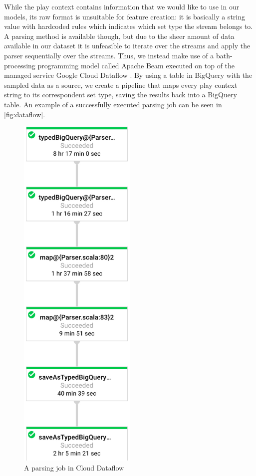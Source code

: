 \documentclass{kththesis}
\begin{document}
While the play context contains information that we would like to use in our models, its raw format is unsuitable for feature creation: it is basically a string value with hardcoded rules which indicates which set type the stream belongs to. A parsing method is available though, but due to the sheer amount of data available in our dataset it is unfeasible to iterate over the streams and apply the parser sequentially over the streams. Thus, we instead make use of a bath-processing programming model called Apache Beam  executed on top of the managed service Google Cloud Dataflow . By using a table in BigQuery with the sampled data as a source, we create a pipeline that maps every play context string to its correspondent set type, saving the results back into a BigQuery table. An example of a successfully executed parsing job can be seen in \autoref{fig:dataflow}.

	\begin{figure}[h]
    \centering
    \includegraphics[width=0.5\textwidth,height=0.5\textheight,keepaspectratio]{figures/dataflow.pdf}
    \caption{A parsing job in Cloud Dataflow}
    \label{fig:dataflow}
	\end{figure}
\end{document}
